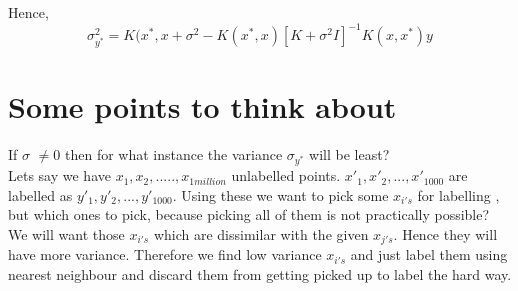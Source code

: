 \documentclass[12pt]{article}
\begin{document}
Hence,
\begin{equation*}
    \sigma_{y^*}^2 = K(x^*,x+\sigma^2 - K(x^*,x)[K+\sigma^2 I]^{-1} K(x,x^*) y
\end{equation*}


\section{Some points to think about}

If $\sigma$ $\neq 0$ then for what instance the variance $\sigma_{y^*}$ will be least?\\


Lets say we have $x_1 , x_2 ,....., x_{1million}$ unlabelled points.
$x'_1,x'_2, ... , x'_{1000}$ are labelled as $y'_1,y'_2, ... , y'_{1000}$.
Using these we want to pick some $x_{i's}$ for labelling , but which ones to pick, because picking all of them is not practically possible?\\

\hspace{5mm} We will want those $x_{i's}$ which are dissimilar with the given $x_{j's}$. Hence they will have more variance. Therefore we find low variance $x_{i's}$ and just label them using nearest neighbour and discard them from getting picked up to label the hard way.




\end{document}
